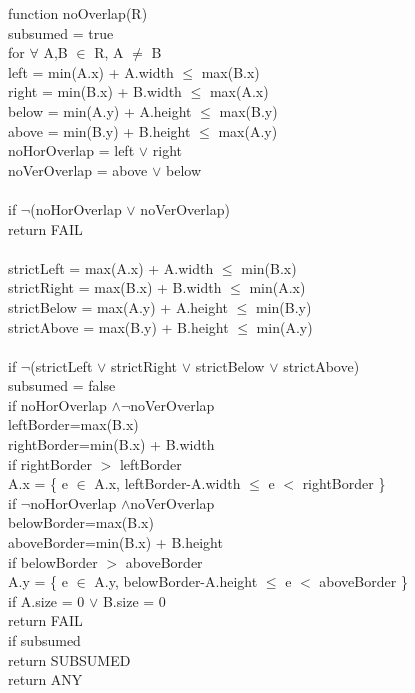 function noOverlap(R) \\
\indent subsumed = true \\
\indent for $\forall$ A,B $\in$ R, A $\neq$ B \\
\indent \indent left = min(A.x) + A.width $\leq$ max(B.x) \\
\indent \indent right = min(B.x) + B.width $\leq$ max(A.x) \\
\indent \indent below = min(A.y) + A.height $\leq$ max(B.y) \\
\indent \indent above = min(B.y) + B.height $\leq$ max(A.y) \\
\indent \indent noHorOverlap = left $\vee$ right \\
\indent \indent noVerOverlap = above $\vee$ below \\
\\
\indent \indent if $\neg$(noHorOverlap $\vee$ noVerOverlap) \\
\indent \indent \indent return FAIL \\
\\
\indent \indent strictLeft = max(A.x) + A.width $\leq$ min(B.x) \\
\indent \indent strictRight = max(B.x) + B.width $\leq$ min(A.x) \\
\indent \indent strictBelow = max(A.y) + A.height $\leq$ min(B.y) \\
\indent \indent strictAbove = max(B.y) + B.height $\leq$ min(A.y) \\
\\
\indent \indent if $\neg$(strictLeft $\vee$ strictRight $\vee$ strictBelow $\vee$ strictAbove) \\
\indent \indent \indent subsumed = false \\
\indent \indent if noHorOverlap $\land \neg$noVerOverlap \\
\indent \indent \indent leftBorder=max(B.x) \\
\indent \indent \indent rightBorder=min(B.x) + B.width \\
\indent \indent if rightBorder $>$ leftBorder \\ 
\indent \indent \indent A.x = \{ e $\in$ A.x, leftBorder-A.width $\leq$ e $<$ rightBorder \} \\
\indent \indent if $\neg$noHorOverlap $\land$noVerOverlap \\
\indent \indent \indent belowBorder=max(B.x) \\
\indent \indent \indent aboveBorder=min(B.x) + B.height \\
\indent \indent if belowBorder $>$ aboveBorder \\ 
\indent \indent \indent A.y = \{ e $\in$ A.y, belowBorder-A.height $\leq$ e $<$ aboveBorder \} \\
\indent \indent if A.size = 0 $\vee$ B.size = 0 \\
\indent \indent \indent return FAIL \\
\indent if subsumed \\
\indent \indent return SUBSUMED \\
\indent return ANY \\